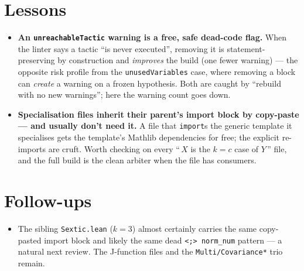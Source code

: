 \documentclass[11pt]{article}
\begin{document}
\section{Lessons}
\begin{itemize}[noitemsep]
  \item \textbf{An \texttt{unreachableTactic} warning is a free, safe dead-code flag.} When the linter says a
    tactic ``is never executed'', removing it is statement-preserving by construction and \emph{improves} the
    build (one fewer warning) --- the opposite risk profile from the \texttt{unusedVariables} case, where
    removing a block can \emph{create} a warning on a frozen hypothesis. Both are caught by ``rebuild with no
    new warnings''; here the warning count goes down.
  \item \textbf{Specialisation files inherit their parent's import block by copy-paste --- and usually don't
    need it.} A file that \texttt{import}s the generic template it specialises gets the template's Mathlib
    dependencies for free; the explicit re-imports are cruft. Worth checking on every ``\,$X$ is the $k=c$ case
    of $Y$\,'' file, and the full build is the clean arbiter when the file has consumers.
\end{itemize}

\section{Follow-ups}
\begin{itemize}[noitemsep]
  \item The sibling \texttt{Sextic.lean} ($k=3$) almost certainly carries the same copy-pasted import block and
    likely the same dead \texttt{<;> norm\_num} pattern --- a natural next review. The J-function files and the
    \texttt{Multi/Covariance*} trio remain.
\end{itemize}
\end{document}
